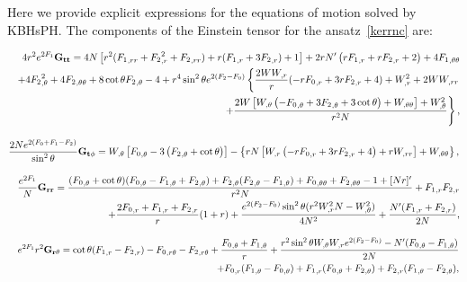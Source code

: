\documentclass{article}
\numberwithin{equation}{section}
\begin{document}
Here we provide explicit expressions for the equations of motion solved by KBHsPH. The components of the Einstein tensor for the ansatz~\eqref{kerrnc} are:



\begin{eqnarray}
&&  4r^2  e^{2F_1}{\bf G_{tt}}= 4 
N \left[r^2 ({F_1}_{,rr}+ {F_2}_{,r}^2+
{F_2}_{,rr})
+r( 
{F_1}_{,r}+3  {F_2}_{,r})+1\right] + 2 r N'  \left(r 
{F_1}_{,r}+r {F_2}_{,r}+2\right)+4 {F_1}_{,\theta\theta}\nonumber \\
%
&& +4  
{F_2}_{,\theta}^2+4  {F_2}_{,\theta\theta}
%
+8
\cot \theta {F_2}_{,\theta}-4 
%
 +r^4 \sin ^2\theta e^{2 ({F_2}-F_0)} 
 \left\{
 \frac{2W W_{,r}}{r}(- r {F_0}_{,r} +3r{F_2}_{,r}+4 )
 +W_{,r}^2+2W W_{,rr} 
 \right. \nonumber \\ 
%
&& \left. + \frac{2 W \left[W_{,\theta} \left(- 
{F_0}_{,\theta}+3 {F_2}_{,\theta}+3 \cot\theta\right)+ W_{,\theta\theta}\right]+ W_{,\theta}^2}{r^2N} \right\},
\end{eqnarray}

\begin{equation}
\frac{2Ne^{2(F_0+F_1-F_2)}}{\sin^2\theta}{\bf G_{t\phi }}=   W_{,\theta} \left[ {F_0}_{,\theta}-3 \left( 
{F_2}_{,\theta}+\cot\theta\right)\right]- \left\{r N 
\left[W_{,r} \left(-r {F_0}_{,r}+3 r 
{F_2}_{,r}+4\right)+r 
W_{,rr}\right]+W_{,\theta\theta}\right\}  ,
\end{equation}



\begin{eqnarray}
&&  \frac{e^{2F_1}}{N}{\bf G_{rr}}= \frac{({F_0}_{,\theta}+\cot\theta)({F_0}_{,\theta}-{F_1}_{,\theta}+
{F_2}_{,\theta})+{F_2}_{,\theta}({F_2}_{,\theta}-{F_1}_{,\theta})
+{F_0}_{,\theta\theta}+{F_2}_{,\theta\theta}-1+[Nr]'}{r^2 N}+{F_1}_{,r} {F_2}_{,r}\nonumber \\
&& 
%
+\frac{2{F_0}_{,r}+{F_1}_{,r}+{F_2}_{,r}}{r}(1+r)+\frac{e^{2(
{F_2}- {F_0})} \sin ^2\theta (r^2W_{,r}^2N-W_{,\theta}^2 ) }{4 N^2} 
%
+\frac{N'( 
{F_1}_{,r}+{F_2}_{,r})}{2N},
\end{eqnarray}


\begin{eqnarray}
 && e^{2F_1}r^2{\bf G_{r\theta}}=
\cot\theta (
{F_1}_{,r} -{F_2}_{,r} )-{F_0}_{,r\theta}-{F_2}_{,r\theta}+\frac{{F_0}_{,\theta}+{F_1}_{,\theta}}{r}+\frac{r^2 \sin ^2\theta 
W_{,\theta} W_{,r} e^{2( {F_2}- {F_0})}-N'( {F_0}_{,\theta}-{F_1}_{,\theta})}{2 
N} \nonumber \\ 
&& + {F_0}_{,r} ({F_1}_{,\theta}-{F_0}_{,\theta})+
{F_1}_{,r}({F_0}_{,\theta}+{F_2}_{,\theta} )+{F_2}_{,r}( {F_1}_{,\theta}- {F_2}_{,\theta} ),
\end{eqnarray}
\end{document}
